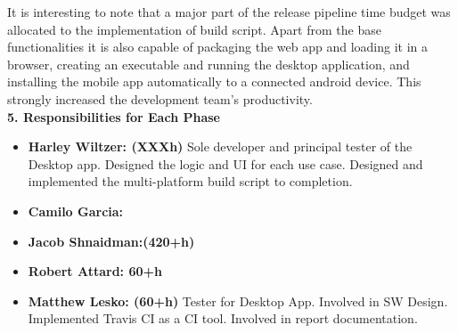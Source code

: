 \documentclass[12pt]{article}
\begin{document}
It is interesting to note that a major part of the release pipeline time budget was allocated to the
implementation of build script. Apart from the base functionalities it is also capable of packaging
the web app and loading it in a browser, creating an executable and running the desktop application,
and installing the mobile app automatically to a connected android device. This strongly increased
the development team's productivity.\\

\textbf{5. Responsibilities for Each Phase}
\begin{itemize}
    \item \textbf{Harley Wiltzer: (XXXh)} Sole developer and principal tester of the Desktop app. Designed the logic and UI for each use case. Designed and implemented the multi-platform build script to completion.
    \item \textbf{Camilo Garcia: }
    \item \textbf{Jacob Shnaidman:(420+h) }
    \item \textbf{Robert Attard: 60+h}
    \item \textbf{Matthew Lesko: (60+h)} Tester for Desktop App. Involved in SW Design. Implemented Travis CI as a CI tool. Involved in report documentation.
\end{itemize}
\end{document}
